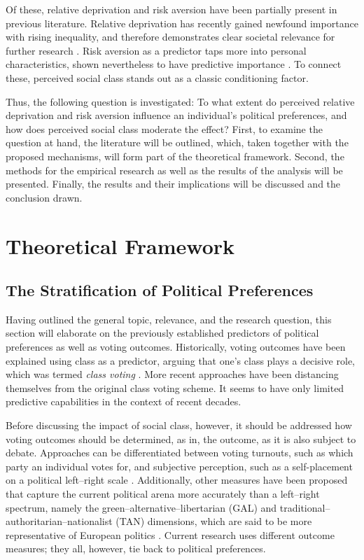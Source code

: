 \documentclass[stu,12pt]{apa7}
\begin{document}
Of these, relative deprivation and risk aversion have been partially present in previous literature. Relative deprivation has recently gained newfound importance with rising inequality, and therefore demonstrates clear societal relevance for further research \parencite{rooduijnParadoxWellbeingUnfavorable2018a}. Risk aversion as a predictor taps more into personal characteristics, shown nevertheless to have predictive importance \parencite{oshriRiskAversionGender2023, gartnerIndividualRiskPreferences2017}. To connect these, perceived social class stands out as a classic conditioning factor.

Thus, the following question is investigated: To what extent do perceived relative deprivation and risk aversion influence an individual’s political preferences, and how does perceived social class moderate the effect? First, to examine the question at hand, the literature will be outlined, which, taken together with the proposed mechanisms, will form part of the theoretical framework. Second, the methods for the empirical research as well as the results of the analysis will be presented. Finally, the results and their implications will be discussed and the conclusion drawn.

\section{Theoretical Framework}

\subsection{The Stratification of Political Preferences}

Having outlined the general topic, relevance, and the research question, this section will elaborate on the previously established predictors of political preferences as well as voting outcomes. Historically, voting outcomes have been explained using class as a predictor, arguing that one’s class plays a decisive role, which was termed \textit{class voting} \parencite{PDFSocialClass}. More recent approaches have been distancing themselves from the original class voting scheme. It seems to have only limited predictive capabilities in the context of recent decades.

Before discussing the impact of social class, however, it should be addressed how voting outcomes should be determined, as in, the outcome, as it is also subject to debate. Approaches can be differentiated between voting turnouts, such as which party an individual votes for, and subjective perception, such as a self-placement on a political left–right scale \parencite{lesschaevePredictivePowerLeftright2017}. Additionally, other measures have been proposed that capture the current political arena more accurately than a left–right spectrum, namely the green–alternative–libertarian (GAL) and traditional–authoritarian–nationalist (TAN) dimensions, which are said to be more representative of European politics \parencite{hoogheDoesLeftRight2002a}. Current research uses different outcome measures; they all, however, tie back to political preferences.
\end{document}
